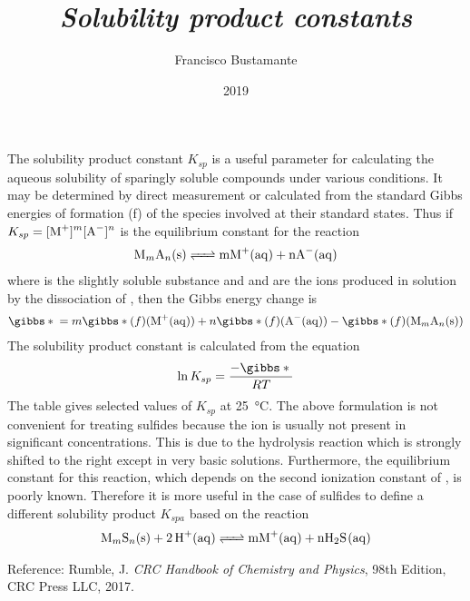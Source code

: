 \documentclass[a4paper, 10pt]{article}
\author{Francisco Bustamante}
\title{\textit{Solubility product constants}}
\date{2019}
\begin{document}
\small

\twocolumn

The solubility product constant $K_{sp}$ is a useful parameter for calculating
the aqueous solubility of sparingly soluble compounds under various conditions.
It may be determined by direct measurement or calculated from the standard Gibbs
energies of formation \gibbs*(f){} of the species involved at their standard
states. Thus if $K_{sp} = \ce{[M+]^m[A^-]^n}$ is the equilibrium constant for
the reaction
%
\begin{align*}
    \ce{M_mA_n(s) <=> mM+(aq) + nA-(aq)}
\end{align*}
%
where  is the slightly soluble substance and  and  are
the ions produced in solution by the dissociation of , then the Gibbs
energy change is
%
\begin{align*}
    \gibbs*{} = m\gibbs*(f){}(\ce{M+(aq)}) + n\gibbs*(f){}(\ce{A-(aq)}) - \gibbs*(f){}(\ce{M_mA_n(s)})
\end{align*}
%
The solubility product constant is calculated from the equation
%
\begin{align*}
    \ln K_{sp} = \dfrac{-\gibbs*{}}{RT}
\end{align*}
%
The table gives selected values of $K_{sp}$ at \SI{25}{\celsius}. The above
formulation is not convenient for treating sulfides because the  ion
is usually not present in significant concentrations. This is due to the
hydrolysis reaction  which is strongly shifted to
the right except in very basic solutions. Furthermore, the equilibrium constant
for this reaction, which depends on the second ionization constant of ,
is poorly known. Therefore it is more useful in the case of sulfides to define
a different solubility product $K_{spa}$ based on the reaction
%
\begin{align*}
    \ce{M_mS_n(s) + 2H+(aq) <=> mM+(aq) + nH2S(aq)}
\end{align*}

Reference: Rumble, J. \textit{CRC Handbook of Chemistry and Physics}, 98th
Edition, CRC Press LLC, 2017.

\end{document}
